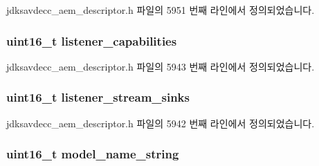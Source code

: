 jdksavdecc\+\_\+aem\+\_\+descriptor.\+h 파일의 5951 번째 라인에서 정의되었습니다.

\subsubsection[{\texorpdfstring{listener\+\_\+capabilities}{listener_capabilities}}]{\setlength{\rightskip}{0pt plus 5cm}uint16\+\_\+t listener\+\_\+capabilities}\hypertarget{structjdksavdecc__descriptor__entity_a3323f8a756edef6c94b10e2ab6c962ee}{}\label{structjdksavdecc__descriptor__entity_a3323f8a756edef6c94b10e2ab6c962ee}


jdksavdecc\+\_\+aem\+\_\+descriptor.\+h 파일의 5943 번째 라인에서 정의되었습니다.

\subsubsection[{\texorpdfstring{listener\+\_\+stream\+\_\+sinks}{listener_stream_sinks}}]{\setlength{\rightskip}{0pt plus 5cm}uint16\+\_\+t listener\+\_\+stream\+\_\+sinks}\hypertarget{structjdksavdecc__descriptor__entity_aacb4d50f4068a0a36c8746e0571bf53b}{}\label{structjdksavdecc__descriptor__entity_aacb4d50f4068a0a36c8746e0571bf53b}


jdksavdecc\+\_\+aem\+\_\+descriptor.\+h 파일의 5942 번째 라인에서 정의되었습니다.

\subsubsection[{\texorpdfstring{model\+\_\+name\+\_\+string}{model_name_string}}]{\setlength{\rightskip}{0pt plus 5cm}uint16\+\_\+t model\+\_\+name\+\_\+string}\hypertarget{structjdksavdecc__descriptor__entity_a1c25086c94b5d1fd63d77b5eaa4ccd74}{}\label{structjdksavdecc__descriptor__entity_a1c25086c94b5d1fd63d77b5eaa4ccd74}


